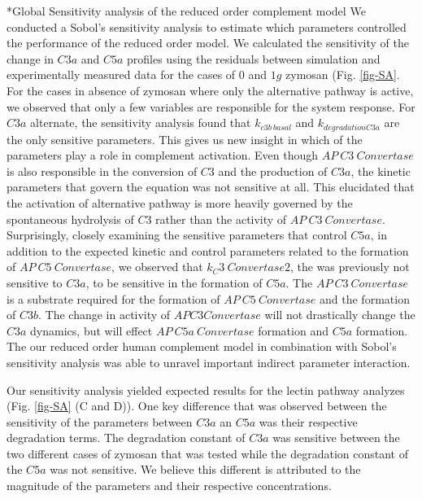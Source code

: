 \documentclass[12pt]{article}
\makeatletter
\renewcommand\subsection{\@startsection
	{subsection}{2}{0mm}
	{-0.05in}
	{-0.5\baselineskip}
	{\normalfont\normalsize\bfseries}}
\makeatother
\begin{document}
\subsection*{Global Sensitivity analysis of the reduced order complement model}
We conducted a Sobol's sensitivity analysis to estimate which parameters controlled the performance of the reduced order model. We calculated the sensitivity of the change in $C3a$ and $C5a$ profiles using the residuals between simulation and experimentally measured data for the cases of $0$ and $1 g$ zymosan (Fig. \ref{fig-SA}. For the cases in absence of zymosan where only the alternative pathway is active, we observed that only a few variables are responsible for the system response. For $C3a$ alternate, the sensitivity analysis found that $k_{c3b~basal}$ and $k_{degradationC3a}$ are the only sensitive parameters. This gives us new insight in which of the parameters play a role in complement activation. Even though $AP~C3~Convertase$ is also responsible in the conversion of $C3$ and the production of $C3a$, the kinetic parameters that govern the equation was not sensitive at all. This elucidated that the activation of alternative pathway is more heavily governed by the spontaneous hydrolysis of $C3$ rather than the activity of $AP~C3~Convertase$. Surprisingly, closely examining the sensitive parameters that control $C5a$, in addition to the expected kinetic and control parameters related to the formation of $AP~C5~Convertase$, we observed that $k_C3~Convertase2$, the was previously not sensitive to $C3a$, to be sensitive in the formation of $C5a$. The $AP~C3~Convertase$ is a substrate required for the formation of $AP~C5~Convertase$ and the formation of $C3b$. The change in activity of $AP C3 Convertase$  will not drastically change the $C3a$ dynamics, but will effect $AP~C5a~Convertase$ formation and $C5a$ formation. The our reduced order human complement model in combination with Sobol's sensitivity analysis was able to unravel important indirect parameter interaction.

Our sensitivity analysis yielded expected results for the lectin pathway analyzes (Fig. \ref{fig-SA} (C and D)). One key difference that was observed between the sensitivity of the parameters between $C3a$ an $C5a$ was their respective degradation terms. The degradation constant of $C3a$ was sensitive between the two different cases of zymosan that was tested while the degradation constant of the $C5a$ was not sensitive. We believe this different is attributed to the magnitude of the parameters and their respective concentrations.
\end{document}
